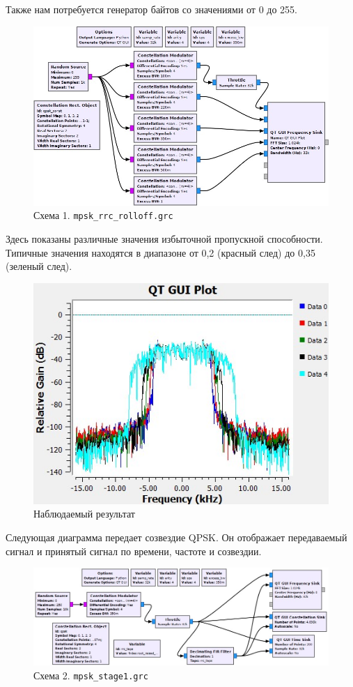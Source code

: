 \documentclass[a4paper, 12pt]{report}
\begin{document}
	Также нам потребуется генератор байтов со значениями от 0 до 255. 
	\begin{figure}[H]
		\centering
		\includegraphics[width=1.0\textwidth]{1.jpg}
		\caption{Схема 1. \texttt{mpsk\_rrc\_rolloff.grc}}
		\label{fig:1}
	\end{figure}
	Здесь показаны различные значения избыточной пропускной способности. Типичные значения находятся в диапазоне от 0,2 (красный след) до 0,35 (зеленый след).
	\begin{figure}[H]
		\centering
		\includegraphics[width=1.0\textwidth]{2.jpg}
		\caption{Наблюдаемый результат}
		\label{fig:2}
	\end{figure}
	Следующая диаграмма передает созвездие QPSK. Он отображает передаваемый сигнал и принятый сигнал по времени, частоте и созвездии.
	\begin{figure}[H]
		\centering
		\includegraphics[width=1.0\textwidth]{3.jpg}
		\caption{Схема 2. \texttt{mpsk\_stage1.grc}}
		\label{fig:3}
	\end{figure}
\end{document}
